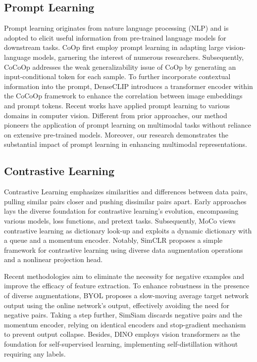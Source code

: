 \documentclass[letterpaper]{article}
\begin{document}
\subsection{Prompt Learning}
Prompt learning originates from nature language processing (NLP) and is adopted to elicit useful information from pre-trained language models for downstream tasks. CoOp \cite{zhou2022learning} first employ prompt learning in adapting large vision-language models, garnering the interest of numerous researchers. Subsequently, CoCoOp \cite{zhou2022conditional} addresses the weak generalizability issue of CoOp by generating an input-conditional token for each sample. To further incorporate contextual information into the prompt, DenseCLIP \cite{rao2022denseclip} introduces a transformer encoder within the CoCoOp framework to enhance the correlation between image embeddings and prompt tokens. Recent works \cite{Wang_2022_CVPR, Li_2022_CVPR, gan2023decorate} have applied prompt learning to various domains in computer vision. Different from prior approaches, our method pioneers the application of prompt learning on multimodal tasks without reliance on extensive pre-trained models. Moreover, our research demonstrates the substantial impact of prompt learning in enhancing multimodal representations.

\subsection{Contrastive Learning}
Contrastive Learning emphasizes similarities and differences between data pairs, pulling similar pairs closer and pushing dissimilar pairs apart.
Early approaches  \cite{wu2018unsupervised, ye2019unsupervised, tian2020contrastive} lays the diverse foundation for contrastive learning's evolution, encompassing various models, loss functions, and pretext tasks.
Subsequently, MoCo \cite{he2020momentum} views contrastive learning as dictionary look-up and exploits a dynamic dictionary  with a queue and a momentum encoder. Notably, SimCLR \cite{chen2020simple} proposes a simple framework for contrastive learning using diverse data augmentation operations and a nonlinear projection head.

Recent methodologies aim to eliminate the necessity for negative examples and improve the efficacy of feature extraction. To enhance robustness in the presence of diverse augmentations, BYOL \cite{grill2020bootstrap} proposes a slow-moving average target network output using the online network's output, effectively avoiding the need for negative pairs. Taking a step further, SimSiam \cite{chen2021exploring} discards negative pairs and the momentum encoder, relying on identical encoders and stop-gradient mechanism to prevent output collapse. Besides, DINO \cite{caron2021emerging} employs vision transformers as the foundation for self-supervised learning, implementing self-distillation without requiring any labels.
\end{document}
